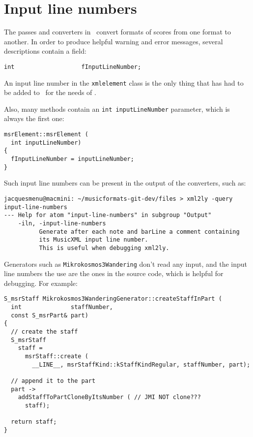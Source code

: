 \section{Input line numbers}

The passes and converters in \mf\ convert formats of scores from one format to another. In order to produce helpful warning and error messages, several descriptions contain a field:
\begin{lstlisting}[language=CPlusPlus]
    int                   fInputLineNumber;
\end{lstlisting}

An input line number in the {\tt xmlelement} class   is the only thing that has had to be added to \libmusicxml\ for the needs of \mf.

Also, many methods contain an {\tt int inputLineNumber} parameter, which is always the first one:
\begin{lstlisting}[language=CPlusPlus]
msrElement::msrElement (
  int inputLineNumber)
{
  fInputLineNumber = inputLineNumber;
}
\end{lstlisting}

Such input line numbers can be present in the output of the converters, such as:
\begin{lstlisting}[language=Terminal]
jacquesmenu@macmini: ~/musicformats-git-dev/files > xml2ly -query input-line-numbers
--- Help for atom "input-line-numbers" in subgroup "Output"
    -iln, -input-line-numbers
          Generate after each note and barLine a comment containing
          its MusicXML input line number.
          This is useful when debugging xml2ly.
\end{lstlisting}

Generators such as {\tt Mikrokosmos3Wandering} don't read any input, and the input line numbers the use are the ones in the source code, which is helpful for debugging. For example:
\begin{lstlisting}[language=CPlusPlus]
S_msrStaff Mikrokosmos3WanderingGenerator::createStaffInPart (
  int              staffNumber,
  const S_msrPart& part)
{
  // create the staff
  S_msrStaff
    staff =
      msrStaff::create (
        __LINE__, msrStaffKind::kStaffKindRegular, staffNumber, part);

  // append it to the part
  part ->
    addStaffToPartCloneByItsNumber ( // JMI NOT clone???
      staff);

  return staff;
}
\end{lstlisting}

